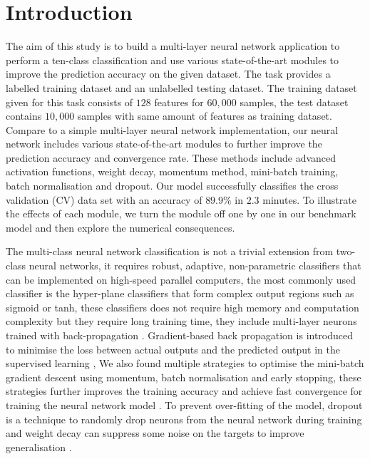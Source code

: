 \section{Introduction\label{chapter1}}

The aim of this study is to build a multi-layer neural network application to perform a ten-class classification and use various state-of-the-art modules to improve the prediction accuracy on the given dataset.
The task provides a labelled training dataset and an unlabelled testing dataset.
The training dataset given for this task consists of $128$ features for $60,000$ samples,
the test dataset contains $10,000$ samples with same amount of features as training dataset.
Compare to a simple multi-layer neural network implementation,%
our neural network includes various state-of-the-art modules to further improve the prediction accuracy and convergence rate. These methods include advanced activation functions, 
weight decay, 
momentum method,
mini-batch training, batch normalisation and dropout. 
Our model successfully classifies the cross validation (CV) data set with an accuracy of $89.9\%$ in $2.3$ minutes. 
To illustrate the effects of each module, we turn the module off one by one in our benchmark model and then explore the numerical consequences.

The multi-class neural network classification is not a trivial extension from two-class neural networks,
it requires robust, adaptive, non-parametric classifiers that can be implemented on high-speed parallel computers,
the most commonly used classifier is the hyper-plane classifiers that form complex output regions such as sigmoid or tanh,
these classifiers does not require high memory and computation complexity but they require long training time,
they include multi-layer neurons trained with back-propagation \citet{werbos1990backpropagation}.
Gradient-based back propagation is introduced to minimise the loss between actual outputs and the predicted output in the supervised learning \citet{lecun1998Gradient},
We also found multiple strategies to optimise the mini-batch gradient descent using momentum, batch normalisation and early stopping,
these strategies further improves the training accuracy and achieve fast convergence for training the neural network model \citet{ruder2016overview}.
To prevent over-fitting of the model, dropout is a technique to randomly drop neurons from the neural network during training \citet{dropout} and weight decay can suppress some noise on the targets to improve generalisation \citet{NIPS1991_563}.

